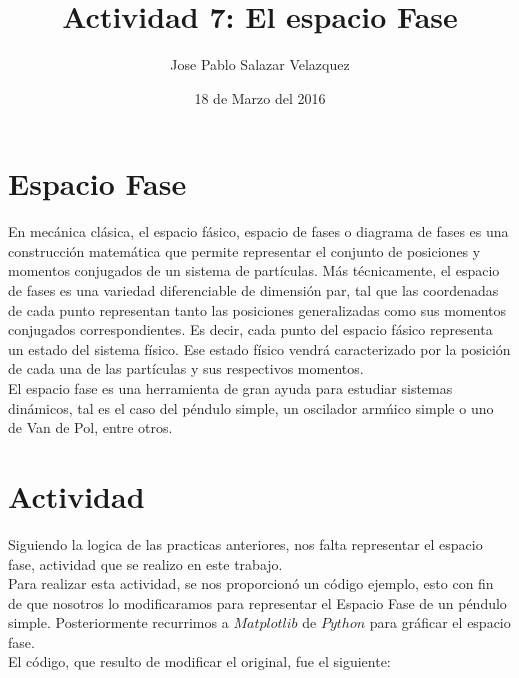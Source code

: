 \documentclass[12pt,letterpaper]{article}
\begin{document}
\title{Actividad 7: El espacio Fase}
\author{Jose Pablo Salazar Velazquez}
\date{18 de Marzo del 2016}

\maketitle

\section*{Espacio Fase}
En mecánica clásica, el espacio fásico, espacio de fases o diagrama de fases es una construcción matemática que permite representar el conjunto de posiciones y momentos conjugados de un sistema de partículas. Más técnicamente, el espacio de fases es una variedad diferenciable de dimensión par, tal que las coordenadas de cada punto representan tanto las posiciones generalizadas como sus momentos conjugados correspondientes. Es decir, cada punto del espacio fásico representa un estado del sistema físico. Ese estado físico vendrá caracterizado por la posición de cada una de las partículas y sus respectivos momentos. \\
El espacio fase es una herramienta de gran ayuda para estudiar sistemas dinámicos, tal es el caso del péndulo simple, un oscilador armńico simple o uno de Van de Pol, entre otros.

\section*{Actividad}
Siguiendo la logica de las practicas anteriores, nos falta representar el espacio fase, actividad que se realizo en este trabajo.\\
Para realizar esta actividad, se nos proporcionó un código ejemplo, esto con fin de que nosotros lo modificaramos para representar el Espacio Fase de un péndulo simple. Posteriormente recurrimos a $Matplotlib$ de $Python$ para gráficar el espacio fase.\\

El código, que resulto de modificar el original, fue el siguiente:
\end{document}
